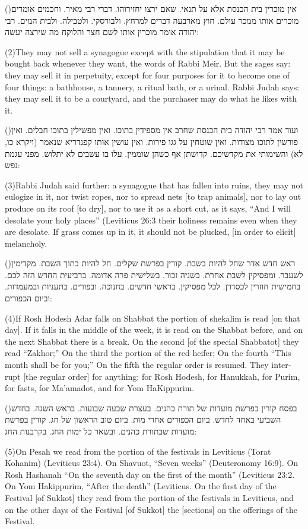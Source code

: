 \documentclass[12pt, openany]{book}
\newcommand{\sethebfont}{
\fontsize{10.5pt}{13.1pt} \selectfont
}
\newcommand{\hebeng}[2]{
	{\sethebfont #1\\}
	
	\begin{english}
		#2
	\end{english}
	\clearpage
}
\newcommand{\vsnum}[1]{(\hebrewnumeral{#1})\space}
\newcommand{\vsnumeng}[1]{(#1)\space}
\begin{document}
\hebeng{\vsnum{2}אין מוכרין בית הכנסת אלא על תנאי. שאם ירצו יחזירוהו. דברי רבי מאיר. וחכמים אומרים מוכרים אותו ממכר עולם. חוץ מארבעה דברים למרחץ. ולבורסקי. ולטבילה. ולבית המים. רבי יהודה אומר מוכרין אותו לשם חצר והלוקח מה שירצה יעשה: }{\vsnumeng{2}They may not sell a synagogue except with the stipulation that it may be bought back whenever they want, the words of Rabbi Meir. But the sages say: they may sell it in perpetuity, except for four purposes for it to become one of four things: a bathhouse, a tannery, a ritual bath, or a urinal. Rabbi Judah says: they may sell it to be a courtyard, and the purchaser may do what he likes with it.}%

\hebeng{\vsnum{3}ועוד אמר רבי יהודה בית הכנסת שחרב אין מספידין בתוכו. ואין מפשילין בתוכו חבלים. ואין פורשין לתוכו מצודות. ואין שוטחין על גגו פירות. ואין עושין אותו קפנדריא שנאמר (ויקרא כו, לא) והשימותי את מקדשיכם. קדושתן אף כשהן שוממין. עלו בו עשבים לא יתלוש. מפני עגמת נפש: }{\vsnumeng{3}Rabbi Judah said further: a synagogue that has fallen into ruins, they may not eulogize in it, nor twist ropes, nor to spread nets {[to trap animals]}, nor to lay out produce on its roof {[to dry]}, nor to use it as a short cut, as it says, “And I will desolate your holy places” (Leviticus 26:3 their holiness remains even when they are desolate. If grass comes up in it, it should not be plucked, {[in order to elicit]} melancholy.}%

\hebeng{\vsnum{4}ראש חדש אדר שחל להיות בשבת. קורין בפרשת שקלים. חל להיות בתוך השבת. מקדימין לשעבר. ומפסיקין לשבת אחרת. בשניה זכור. בשלישית פרה אדומה. ברביעית החדש הזה לכם. בחמישית חוזרין לכסדרן. לכל מפסיקין. בראשי חדשים. בחנוכה. ובפורים. בתעניות ובמעמדות. וביום הכפורים: }{\vsnumeng{4}If Rosh Hodesh Adar falls on Shabbat the portion of shekalim is read {[on that day]}. If it falls in the middle of the week, it is read on the Shabbat before, and on the next Shabbat there is a break. On the second {[of the special Shabbatot]} they read “Zakhor;” On the third the portion of the red heifer; On the fourth “This month shall be for you;” On the fifth the regular order is resumed. They interrupt {[the regular order]} for anything: for Rosh Hodesh, for Hanukkah, for Purim, for fasts, for Ma’amadot, and for Yom HaKippurim.}%

\hebeng{\vsnum{5}בפסח קורין בפרשת מועדות של תורת כהנים. בעצרת שבעה שבועות. בראש השנה. בחדש השביעי באחד לחדש. ביום הכפורים אחרי מות. ביום טוב הראשון של חג. קורין בפרשת מועדות שבתורת כהנים. ובשאר כל ימות החג. בקרבנות החג: }{\vsnumeng{5}On Pesah we read from the portion of the festivals in Leviticus (Torat Kohanim) (Leviticus 23:4). On Shavuot, “Seven weeks” (Deuteronomy 16:9). On Rosh Hashanah “On the seventh day on the first of the month” (Leviticus 23:2. On Yom Hakippurim, “After the death” (Leviticus. On the first day of the Festival {[of Sukkot]} they read from the portion of the festivals in Leviticus, and on the other days of the Festival {[of Sukkot]} the {[sections]} on the offerings of the Festival.}%
\end{document}
